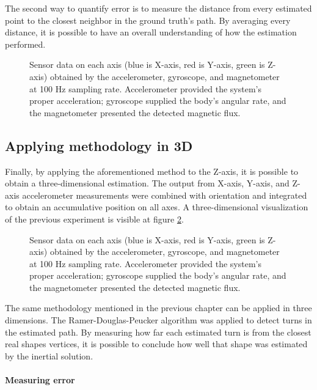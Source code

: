 The second way to quantify error is to measure the distance from every estimated point to the closest neighbor in the ground truth's path. By averaging every distance, it is possible to have an overall understanding of how the estimation performed.

\begin{figure}
    \centering
    \resizebox{1\linewidth}{!}{}
    \caption{Sensor data on each axis (blue is X-axis, red is Y-axis, green is Z-axis) obtained by the accelerometer, gyroscope, and magnetometer at 100 Hz sampling rate. Accelerometer provided the system's proper acceleration; gyroscope supplied the body's angular rate, and the magnetometer presented the detected magnetic flux.}
    \label{fig:square}
\end{figure}

\subsection{Applying methodology in 3D}

Finally, by applying the aforementioned method to the Z-axis, it is possible to obtain a  three-dimensional estimation. The output from X-axis, Y-axis, and Z-axis accelerometer measurements were combined with orientation and integrated to obtain an accumulative position on all axes.
A three-dimensional visualization of the previous experiment is visible at figure \ref{fig:square3D}.

\begin{figure}
    \centering
    \resizebox{1\linewidth}{!}{}
    \caption{Sensor data on each axis (blue is X-axis, red is Y-axis, green is Z-axis) obtained by the accelerometer, gyroscope, and magnetometer at 100 Hz sampling rate. Accelerometer provided the system's proper acceleration; gyroscope supplied the body's angular rate, and the magnetometer presented the detected magnetic flux.}
    \label{fig:square3D}
\end{figure}

The same methodology mentioned in the previous chapter can be applied in three dimensions. The Ramer-Douglas-Peucker algorithm was applied to detect turns in the estimated path. By measuring how far each estimated turn is from the closest real shapes vertices, it is possible to conclude how well that shape was estimated by the inertial solution.

\paragraph{Measuring error}


